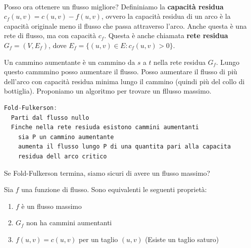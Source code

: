 \documentclass[a4paper]{article}
\begin{document}
\\
Posso ora ottenere un flusso migliore? 
Defininiamo la \textbf{capacità residua} $c_f(u,v) = c(u,v) - f(u,v)$, ovvero la capacità residua di un arco è la capacità originale meno il flusso che passa attraverso l'arco.
Anche questa è una rete di flusso, ma con capacità $c_f$. Questa è anche chiamata \textbf{rete residua} $G_f = (V, E_f)$, dove $E_f = \{(u,v) \in E : c_f(u,v) > 0\}$.
\begin{figure}[H]
  \centering
\end{figure}
\noindent
Un cammino aumentante è un cammino da $s$ a $t$ nella rete residua $G_f$. Lungo questo cammmino
posso aumentare il flusso. Posso aumentare il flusso di più dell'arco con capacità residua minima lungo il cammino (quindi più del collo di bottiglia).
Proponiamo un algoritmo per trovare un fllusso massimo.
\begin{lstlisting}[language=Scala]
Fold-Fulkerson: 
  Parti dal flusso nullo
  Finche nella rete resiuda esistono cammini aumentanti 
    sia P un cammino aumentante
    aumenta il flusso lungo P di una quantita pari alla capacita
    residua dell arco critico
\end{lstlisting}
\noindent
Se Fold-Fulkerson termina, siamo sicuri di avere un flusso massimo?
\thm{}
{
  Sia $f$ una funzione di flusso. Sono equivalenti le seguenti proprietà:
  \begin{enumerate}
    \item $f$ è un flusso massimo
    \item $G_f$ non ha cammini aumentanti
    \item $f(u,v) = c(u,v)$ per un taglio $(u,v)$ (Esiste un taglio saturo)
  \end{enumerate}
}
\end{document}
